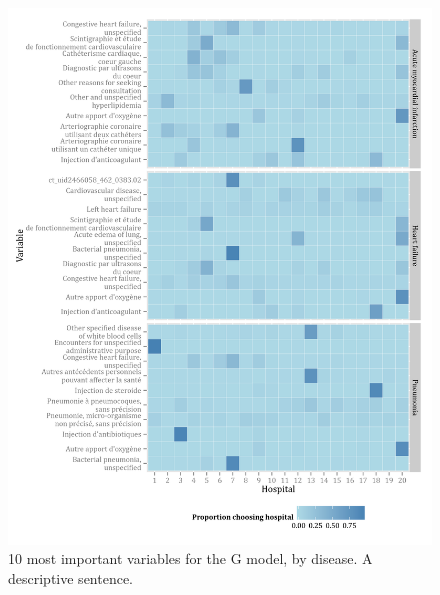 \documentclass[]{article}\usepackage[]{graphicx}\usepackage[]{color}
\begin{document}
\begin{figure}[H]
    \includegraphics{../figures/top_10_variable_importance_and_hospital.png}
    \caption[Error rate for random forest model of hospital choice.]
      {10 most important variables for the G model, by disease. A descriptive sentence.}
    \label{fig:top_10_variable_importance_and_hospital}
\end{figure}
\end{document}
